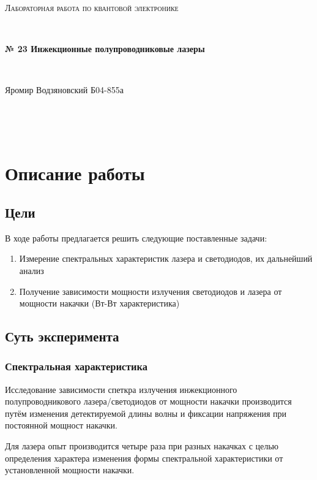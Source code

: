 \documentclass[a4paper]{article}
\begin{document}
\graphicspath{ {pictures/} }
\begin{center}
    {\scshape\Large Лабораторная работа по квантовой электронике} \par

    \

    {\huge\bfseries № 23 Инжекционные полупроводниковые лазеры} \par 

    \

    {\large Яромир Водзяновский Б04-855а}
\end{center}

\

\
\section{Описание работы}

    \subsection{Цели}
        
        \par В ходе работы предлагается решить следующие поставленные задачи:
        
        \begin{enumerate}
            \item Измерение спектральных характеристик лазера и светодиодов, их дальнейший анализ
            \item Получение зависимости мощности излучения светодиодов и лазера от мощности накачки (Вт-Вт характеристика)
        \end{enumerate}
        
    \subsection{Суть эксперимента}
        \subsubsection{Спектральная характеристика}
            
            \par Исследование зависимости спеткра излучения инжекционного полупроводникового лазера/светодиодов от мощности накачки производится путём изменения детектируемой длины волны и фиксации напряжения при постоянной мощност накачки.
            \par Для лазера опыт производится четыре раза при разных накачках с целью определения характера изменения формы спектральной характеристики от установленной мощности накачки.
            
\end{document}
